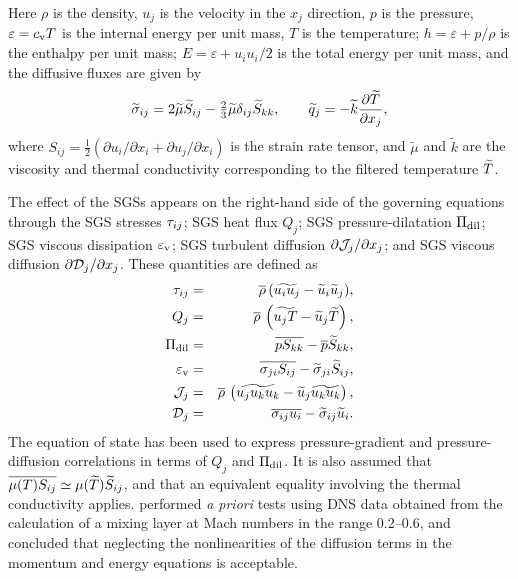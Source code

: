 \documentclass[tcfd]{svjour}
\begin{document}
Here $\rho$ is the density, $u_j$ is the velocity in the $x_j$ direction,
$p$ is the pressure, $\varepsilon=c_{\rm v} T$ is the internal energy
per unit mass, $T$ is the temperature; $h=\varepsilon + p/\rho$ is the
enthalpy per unit mass; $E=\varepsilon +u_iu_i/2$ is the total energy per
unit mass, and the diffusive f\/luxes are given by
\begin{equation}
 \label{eq:sig-hat}
 \widetilde{\sigma}_{ij} = 2\widetilde{\mu} \widetilde{S}_{ij}
 - {\textstyle\frac{2}{3}}\widetilde{\mu} \delta_{ij}\widetilde{S}_{kk}, \qquad
 \widetilde{q}_j = - \widetilde{k}\frac{\partial\widetilde{T}}{\partial x_j} ,
\end{equation}
where $S_{ij}=\frac{1}{2}
(\partial u_i/\partial x_i + \partial u_j/\partial x_i)$ is
the strain rate tensor, and $\widetilde{\mu}$ and $\widetilde{k}$ are the
viscosity and thermal conductivity corresponding to the f\/iltered temperature
$\widetilde{T}$.

The effect of the SGSs appears on the right-hand side of the governing
equations through the SGS stresses $\tau_{ij}$; SGS heat f\/lux $Q_j$; SGS
pressure-dilatation $\Pi_{\rm dil}$; SGS viscous dissipation $\varepsilon_{\rm v}$;
SGS turbulent diffusion $\partial{\cal J}_j/\partial x_j$; and SGS viscous
diffusion $\partial{\cal D}_j/\partial x_j$. These quantities are
def\/ined as
\begin{eqnarray}
 \label{eq:tauij}
 \tij & = & \rhob(\widetilde{u_iu_j}-\util_i\util_j), \\
 \label{eq:qj}
 Q_j & = & \rhob \left(\widetilde{u_j T}-\util_j\widetilde{T}\right), \\
 \label{eq:pdil}
 \Pi_{\rm dil} & = & \overline{p\Skk}-\pb\Stkk, \\
 \label{eq:vdiss}
 \varepsilon_{\rm v} & = & \overline{\sigma_{ji}\Sij}
 - \widetilde{\sigma}_{ji}\Stij,\\
 \label{eq:tdiff}
 {\cal J}_j & = & \rhob\left(\widetilde{u_ju_ku_k} -
 \util_j\widetilde{u_ku_k} \right), \\
 \label{eq:vdiff}
 {\cal D}_j & = & \overline{\sigma_{ij}u_i}
 -\widetilde{\sigma}_{ij}\util_i .
\end{eqnarray}
The equation of state has been used to express pressure-gradient and
pressure-diffusion correlations in terms of $Q_j$ and $\Pi_{\rm dil}$. It
is also assumed that $\overline{\mu(T)S_{ij}} \simeq \mu(\widetilde{T})\widetilde{S}_{ij}$,
and that an equivalent equality involving the thermal conductivity
applies. \citet{vre95b} performed {\it a priori}
tests using DNS data obtained from the calculation of a mixing layer
at Mach numbers in the range 0.2--0.6, and concluded that neglecting
the nonlinearities of the diffusion terms in the momentum and energy
equations is acceptable.
\end{document}
